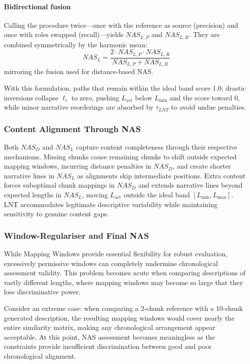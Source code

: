 \documentclass[main.tex]{subfiles}
\begin{document}
\paragraph{Bidirectional fusion}
Calling the procedure twice—once with the reference as source (precision) and once with roles swapped (recall)—yields $NAS_{L,P}$ and $NAS_{L,R}$. They are combined symmetrically by the harmonic mean:
\begin{equation}
NAS_L = \frac{2 \cdot NAS_{L,P} \cdot NAS_{L,R}}{NAS_{L,P} + NAS_{L,R}}
\end{equation}
mirroring the fusion used for distance-based NAS.

With this formulation, paths that remain within the ideal band score 1.0; drastic inversions collapse $\ell_i$ to zero, pushing $L_{\text{act}}$ below $L_{\min}$ and the score toward 0, while minor narrative reorderings are absorbed by $\tau_{LNT}$ to avoid undue penalties.

\subsubsection{Content Alignment Through NAS}
Both $NAS_D$ and $NAS_L$ capture content completeness through their respective mechanisms. Missing chunks cause remaining chunks to shift outside expected mapping windows, incurring distance penalties in $NAS_D$, and create shorter narrative lines in $NAS_L$ as alignments skip intermediate positions. Extra content forces suboptimal chunk mappings in $NAS_D$ and extends narrative lines beyond expected lengths in $NAS_L$, moving $L_{\text{act}}$ outside the ideal band $[L_{\min}, L_{\max}]$. LNT accommodates legitimate descriptive variability while maintaining sensitivity to genuine content gaps.

\subsubsection{Window-Regulariser and Final NAS}
While Mapping Windows provide essential flexibility for robust evaluation, excessively permissive windows can completely undermine chronological assessment validity. This problem becomes acute when comparing descriptions of vastly different lengths, where mapping windows may become so large that they lose discriminative power.

Consider an extreme case: when comparing a 2-chunk reference with a 10-chunk generated description, the resulting mapping windows would cover nearly the entire similarity matrix, making any chronological arrangement appear acceptable. At this point, NAS assessment becomes meaningless as the constraints provide insufficient discrimination between good and poor chronological alignment.
\end{document}
